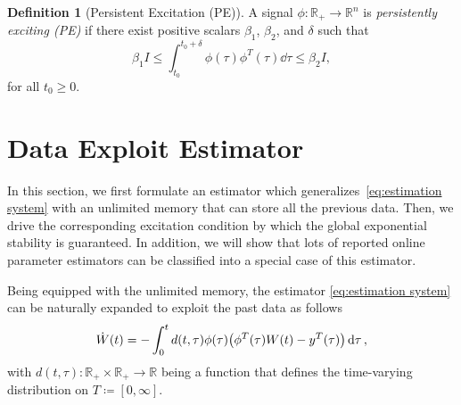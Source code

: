 \documentclass[]{IEEEtran}
\theoremstyle{definition}
\newtheorem{definition}{Definition}
\theoremstyle{remark}
\newcommand{\MB}[1]{\mathbb{#1}}
\begin{document}
\begin{definition}[Persistent Excitation (PE)]
	A signal $\phi: \MB{R}_{+} \to \MB{R}^n$ is \textit{persistently exciting
	(PE)} if there exist positive scalars $\beta_1$, $\beta_2$, and $\delta$ such
	that
	\begin{equation}\label{eq:PE}
		\beta_1 I \le \int_{t_0}^{t_0+\delta} \phi(\tau) \phi^T(\tau) \dd{\tau} \le
		\beta_2 I,
	\end{equation}
	for all $t_0 \ge 0$.
\end{definition}




\section{Data Exploit Estimator}

In this section, we first formulate an estimator which
generalizes~\eqref{eq:estimation system} with an unlimited memory that can
store all the previous data.  Then, we drive the corresponding excitation
condition by which the global exponential stability is guaranteed.  In
addition, we will show that lots of reported online parameter estimators can be
classified into a special case of this estimator.

Being equipped with the unlimited memory, the estimator \eqref{eq:estimation
system} can be naturally expanded to exploit the past data as follows
\begin{equation}\label{eq:estimation system memory}
	\dot{W}(t) = - \int_0^t d(t, \tau) \phi(\tau) \qty(\phi^T(\tau) W(t) -
	y^T(\tau)) \dd{\tau},
\end{equation}
with $d(t, \tau): \MB{R}_{+} \times \MB{R}_{+} \to \MB{R}$ being a function
that defines the time-varying distribution on $T \coloneqq [0, \infty]$.
\end{document}
